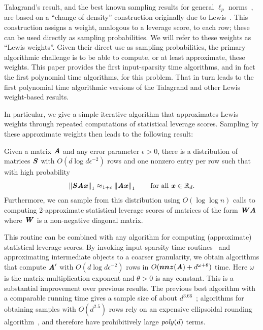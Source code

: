 Talagrand's result, and the best known sampling results for general
$\ell_p$ norms~\cite{BourgainLM89,TalagrandLp}, are based on a
``change of density'' construction originally due to Lewis~\cite{lewis}. This construction
assigns a weight, analogous to a leverage score, to each row; these can be used
directly as sampling probabilities.  We will refer to these weights as ``Lewis weights''.
Given their direct use as sampling probabilities, the primary algorithmic challenge
is to be able to compute, or at least approximate, these weights.  This paper provides
the first input-sparsity time algorithms, and in fact the first polynomial time algorithms,
for this problem.  That in turn leads to the first polynomial time algorithmic versions
of the Talagrand and other Lewis weight-based results.

In particular, we give a simple iterative algorithm that approximates Lewis weights
through repeated computations of statistical leverage scores.
Sampling by these approximate weights then leads to the following result:

\begin{theorem}
\label{thm:main}
Given a matrix $\AA$ and any error parameter $\epsilon > 0$,
there is a distribution of matrices $\SS$ with $O(d \log d \epsilon^{-2})$
rows and one nonzero entry per row such that with high probability
\begin{equation*}
\norm{\SS \AA \xx}_1 \approx_{1 + \epsilon} \norm{\AA \xx}_1
\qquad \text{for all } \xx \in \Re_{d}.
\end{equation*}
Furthermore, we can sample from this distribution using $O(\log \log{n})$ calls
to computing 2-approximate statistical leverage scores of matrices of the
form $\WW \AA$ where $\WW$ is a non-negative diagonal matrix.
\end{theorem}
This routine can be combined with any algorithm for computing (approximate) statistical leverage scores.
By invoking input-sparsity time routines~\cite{ClarksonW13,MahoneyM13,
NelsonN12,LiMP13,CohenLMMPS14:arxiv} and approximating intermediate
objects to a coarser granularity, we obtain algorithms that compute $\AA'$ with
$O(d \log{d} \epsilon^{-2})$ rows in $O(\nnz(\AA) + d^{\omega + \theta} )$ time.
Here $\omega$ is the matrix-multiplication exponent and $\theta > 0$ is any constant.
This is a substantial improvement over previous results.
The previous best algorithm with a comparable running time gives a sample size of
about $d^{3.66}$~\cite{LiMP13}; algorithms for obtaining samples with
$O(d^{2.5})$ rows rely on an expensive ellipsoidal rounding algorithm~\cite{DasguptaDHKM09},
and therefore have prohibitively large $\poly(d)$ terms.

